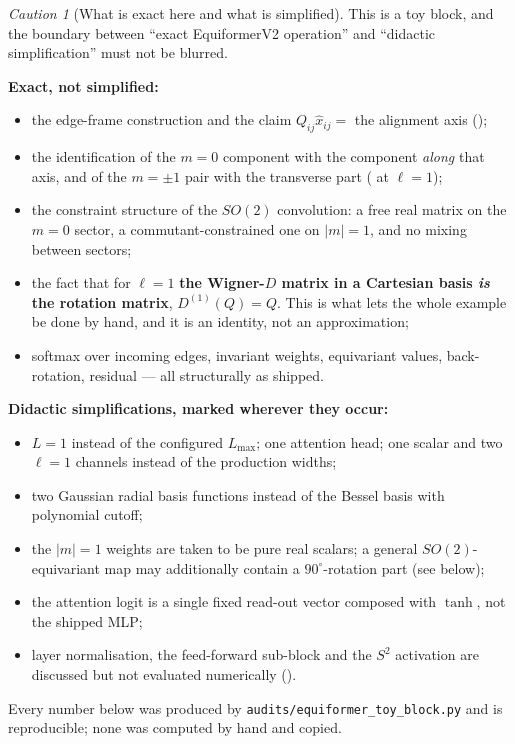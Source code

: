 \documentclass[11pt,a4paper]{report}
\theoremstyle{definition}
\theoremstyle{remark}
\newtheorem{caution}[caution]{Caution}
\newcommand{\file}[1]{\texttt{#1}}
\begin{document}
\begin{caution}[What is exact here and what is simplified]
\label{caution:toy-block-scope}
This is a toy block, and the boundary between ``exact EquiformerV2
operation'' and ``didactic simplification'' must not be blurred.

\textbf{Exact, not simplified:}
\begin{itemize}[nosep]
\item the edge-frame construction and the claim $Q_{ij}\hat x_{ij}=$ the
      alignment axis ();
\item the identification of the $m=0$ component with the component
      \emph{along} that axis, and of the $m=\pm1$ pair with the transverse
      part ( at $\ell=1$);
\item the constraint structure of the $SO(2)$ convolution: a free real
      matrix on the $m=0$ sector, a commutant-constrained one on
      $|m|=1$, and no mixing between sectors;
\item the fact that for $\ell=1$ \textbf{the Wigner-$D$ matrix in a
      Cartesian basis \emph{is} the rotation matrix}, $D^{(1)}(Q)=Q$. This is
      what lets the whole example be done by hand, and it is an identity, not
      an approximation;
\item softmax over incoming edges, invariant weights, equivariant values,
      back-rotation, residual --- all structurally as shipped.
\end{itemize}

\textbf{Didactic simplifications, marked wherever they occur:}
\begin{itemize}[nosep]
\item $L=1$ instead of the configured $L_{\max}$; one attention head; one
      scalar and two $\ell=1$ channels instead of the production widths;
\item two Gaussian radial basis functions instead of the Bessel basis with
      polynomial cutoff;
\item the $|m|=1$ weights are taken to be pure real scalars; a general
      $SO(2)$-equivariant map may additionally contain a
      $90^\circ$-rotation part (see  below);
\item the attention logit is a single fixed read-out vector composed with
      $\tanh$, not the shipped MLP;
\item layer normalisation, the feed-forward sub-block and the $S^2$
      activation are discussed but not evaluated numerically
      ().
\end{itemize}

Every number below was produced by
\file{audits/equiformer\_toy\_block.py} and is reproducible; none was
computed by hand and copied.
\end{caution}
\end{document}
